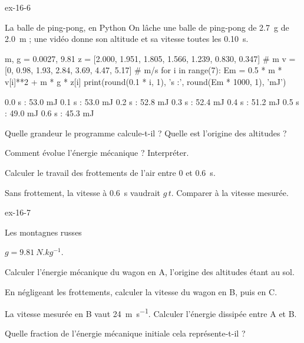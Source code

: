 \begin{blocLivre}{ex-16-6}
\begin{exercice}[2]{La balle de ping-pong, en Python}
On lâche une balle de ping-pong de \qty{2,7}{g} de \qty{2,0}{m} ; une vidéo donne son altitude et sa vitesse toutes les \qty{0,10}{s}.
\begin{python}
m, g = 0.0027, 9.81
z = [2.000, 1.951, 1.805, 1.566, 1.239, 0.830, 0.347]   # m
v = [0, 0.98, 1.93, 2.84, 3.69, 4.47, 5.17]             # m/s
for i in range(7):
    Em = 0.5 * m * v[i]**2 + m * g * z[i]
    print(round(0.1 * i, 1), 's :', round(Em * 1000, 1), 'mJ')
\end{python}
\begin{console}
0.0 s : 53.0 mJ
0.1 s : 53.0 mJ
0.2 s : 52.8 mJ
0.3 s : 52.4 mJ
0.4 s : 51.2 mJ
0.5 s : 49.0 mJ
0.6 s : 45.3 mJ
\end{console}
\begin{questions}
\item {}Quelle grandeur le programme calcule-t-il ? Quelle est l'origine des altitudes ?
\item Comment évolue l'énergie mécanique ? Interpréter.
\item Calculer le travail des frottements de l'air entre 0 et \qty{0,6}{s}.
\item Sans frottement, la vitesse à \qty{0,6}{s} vaudrait $g\,t$. Comparer à la vitesse mesurée.
\end{questions}
\end{exercice}
\end{blocLivre}
\begin{blocLivre}{ex-16-7}
\begin{exercice}[2]{Les montagnes russes}
\begin{donnees}
$g=\qty{9,81}{N.kg^{-1}}$.
\end{donnees}
\begin{questions}
\item Calculer l'énergie mécanique du wagon en A, l'origine des altitudes étant au sol.
\item En négligeant les frottements, calculer la vitesse du wagon en B, puis en C.
\item La vitesse mesurée en B vaut \qty{24}{m.s^{-1}}. Calculer l'énergie dissipée entre A et B.
\item Quelle fraction de l'énergie mécanique initiale cela représente-t-il ?
\end{questions}
\end{exercice}
\end{blocLivre}
